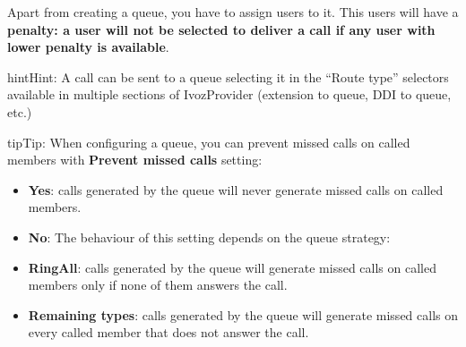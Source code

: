 \documentclass[letterpaper,10pt,english]{sphinxmanual}
\begin{document}
Apart from creating a queue, you have to assign users to it. This users will have
a \textbf{penalty: a user will not be selected to deliver a call if any user with lower
penalty is available}.

\begin{notice}{hint}{Hint:}
A call can be sent to a queue selecting it in the ``Route type'' selectors
available in multiple sections of IvozProvider (extension to queue, DDI
to queue, etc.)
\end{notice}

\begin{notice}{tip}{Tip:}
When configuring a queue, you can prevent missed calls on called members with \textbf{Prevent missed calls} setting:
\begin{itemize}
\item {} 
\textbf{Yes}: calls generated by the queue will never generate missed calls on called members.

\item {} 
\textbf{No}: The behaviour of this setting depends on the queue strategy:

\item {} 
\textbf{RingAll}: calls generated by the queue will generate missed calls on called members only if none of them answers the call.

\item {} 
\textbf{Remaining types}: calls generated by the queue will generate missed calls on every called member that does not answer the call.

\end{itemize}
\end{notice}
\end{document}
